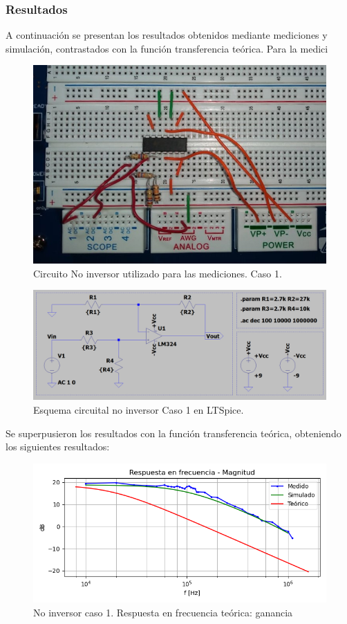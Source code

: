 \subsubsection{Resultados}

A continuación se presentan los resultados obtenidos mediante mediciones y simulación, contrastados con la función transferencia teórica. Para la medici

\begin{figure}[H]
	\centering
	\includegraphics[scale=0.5]{./Imagenes/NoInv1Freq.jpeg}
	\caption{Circuito No inversor utilizado para las mediciones. Caso 1.}
	\label{fig:circnoinvcaso1}
\end{figure}

\begin{figure}[H]
	\centering
	\includegraphics[scale=0.35]{./Imagenes/simuNoInv1.png}
	\caption{Esquema circuital no inversor Caso 1 en LTSpice.}
	\label{fig:circinvcaso1}
\end{figure}

Se superpusieron los resultados con la función transferencia teórica, obteniendo los siguientes resultados:

\begin{figure}[H]
	\centering
		\includegraphics[width=.8\linewidth]{./Imagenes/NoInvCaso1Gain.png}  
		\caption{No inversor caso 1. Respuesta en frecuencia teórica: ganancia}
	\label{fig:circinvcaso1}
\end{figure}

